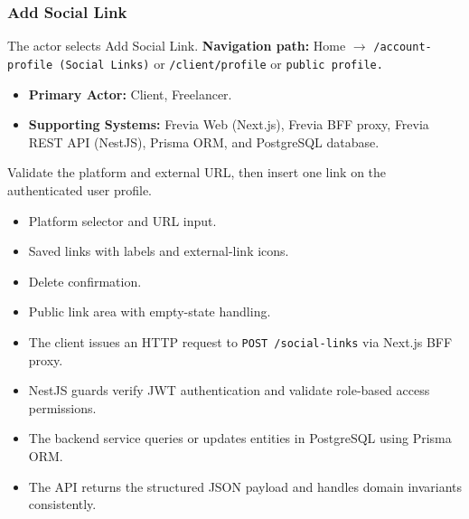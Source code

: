 \subsubsection{Add Social Link}

The actor selects Add Social Link.\newline
\textbf{Navigation path:} Home $\rightarrow$ \texttt{/\allowbreak{}account-\allowbreak{}profile (Social Links)} or \texttt{/\allowbreak{}client/\allowbreak{}profile} or \texttt{public profile.}


\begin{itemize}[leftmargin=1.6em,topsep=3pt,itemsep=2pt,parsep=0pt,label=$\bullet$]
    \item \textbf{Primary Actor:} Client, Freelancer.
    \item \textbf{Supporting Systems:} Frevia Web (Next.js), Frevia BFF proxy, Frevia REST API (NestJS), Prisma ORM, and PostgreSQL database.
\end{itemize}

\noindent Validate the platform and external URL, then insert one link on the authenticated user profile.

\begin{itemize}[leftmargin=1.6em,topsep=3pt,itemsep=2pt,parsep=0pt,label=$\bullet$]
    \item Platform selector and URL input.
    \item Saved links with labels and external-link icons.
    \item Delete confirmation.
    \item Public link area with empty-state handling.
\end{itemize}

\begin{itemize}[leftmargin=1.6em,topsep=3pt,itemsep=2pt,parsep=0pt,label=$\bullet$]
    \item The client issues an HTTP request to \texttt{POST /\allowbreak{}social-\allowbreak{}links} via Next.js BFF proxy.
    \item NestJS guards verify JWT authentication and validate role-based access permissions.
    \item The backend service queries or updates entities in PostgreSQL using Prisma ORM.
    \item The API returns the structured JSON payload and handles domain invariants consistently.
\end{itemize}

